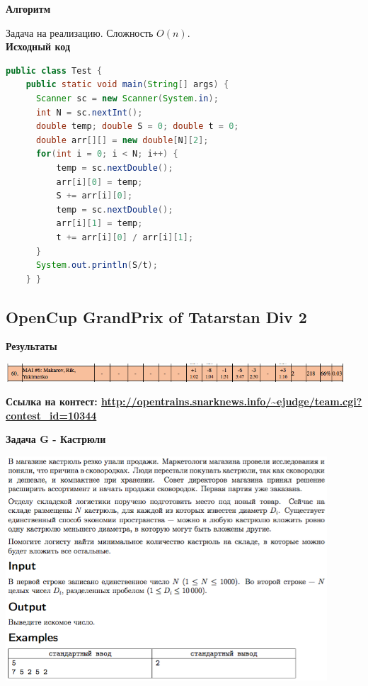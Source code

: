 \documentclass[a4paper,12pt]{article}
\begin{document}
\textbf{{\large Алгоритм}}

Задача на реализацию. Сложность $O(n)$. \\

\textbf{{\large Исходный код}} \\
\begin{lstlisting}[language=Java]
public class Test {
    public static void main(String[] args) {
      Scanner sc = new Scanner(System.in);
      int N = sc.nextInt();
      double temp; double S = 0; double t = 0;      
      double arr[][] = new double[N][2];
      for(int i = 0; i < N; i++) {
          temp = sc.nextDouble();
          arr[i][0] = temp;
          S += arr[i][0];    
          temp = sc.nextDouble();
          arr[i][1] = temp;
          t += arr[i][0] / arr[i][1];
      }
      System.out.println(S/t);
    } }
\end{lstlisting}






%
%
\newpage
\subsection{OpenCup GrandPrix of Tatarstan Div 2}

\textbf{{\large Результаты}} \\
\begin{center}
\includegraphics[width=0.95\textwidth]{OC_Tatarstan_2016/result.png}\\ [1cm]
\end{center}

\textbf{{\large Ссылка на контест: \url{http://opentrains.snarknews.info/~ejudge/team.cgi?contest_id=10344}}}

\newpage
\textbf{{\large Задача G - Кастрюли}}

\begin{center}
\includegraphics[width=0.9\textwidth]{OC_Tatarstan_2016/G.png}\\ [1cm]
\end{center}
\end{document}

